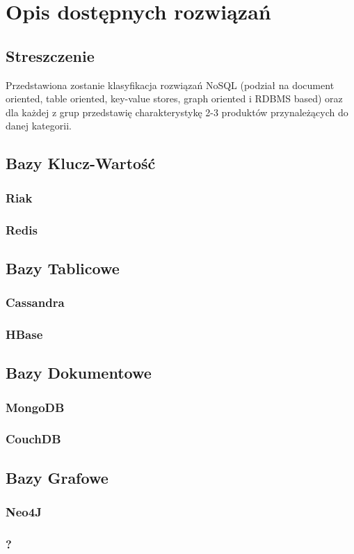 \chapter{Opis dostępnych rozwiązań}

\section*{Streszczenie}
Przedstawiona zostanie klasyfikacja rozwiązań NoSQL (podział na document oriented, table oriented, key-value stores, graph oriented i RDBMS based) oraz dla każdej z grup przedstawię charakterystykę 2-3 produktów przynależących do danej kategorii.

\section{Bazy Klucz-Wartość}

\subsection{Riak}
\label{sec:riak}

\subsection{Redis}
\label{sec:redis}

\section{Bazy Tablicowe}

\subsection{Cassandra}
\label{sec:cassandra}

\subsection{HBase}
\label{sec:hbase}

\section{Bazy Dokumentowe}

\subsection{MongoDB}
\label{sec:mongodb}

\subsection{CouchDB}
\label{sec:couchdb}

\section{Bazy Grafowe}

\subsection{Neo4J}
\label{sec:neo4j}

\subsection{?}
